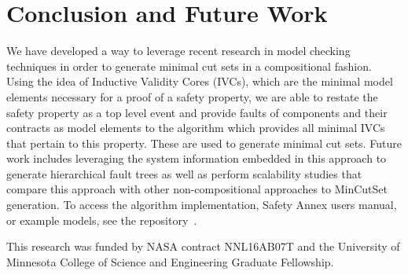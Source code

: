 \section{Conclusion and Future Work}
We have developed a way to leverage recent research in model checking techniques in order to generate minimal cut sets in a compositional fashion. Using the idea of Inductive Validity Cores (IVCs), which are the minimal model elements necessary for a proof of a safety property, we are able to restate the safety property as a top level event and provide faults of components and their contracts as model elements to the \aivcalg algorithm which provides all minimal IVCs that pertain to this property. These are used to generate minimal cut sets. Future work includes leveraging the system information embedded in this approach to generate hierarchical fault trees as well as perform scalability studies that compare this approach with other non-compositional approaches to MinCutSet generation.  %
To access the algorithm implementation, Safety Annex users manual, or example models, see the repository~\cite{SAGithub}. 

\vspace{2 mm}
 This research was funded by NASA contract NNL16AB07T and the University of Minnesota College of Science and Engineering Graduate Fellowship.


